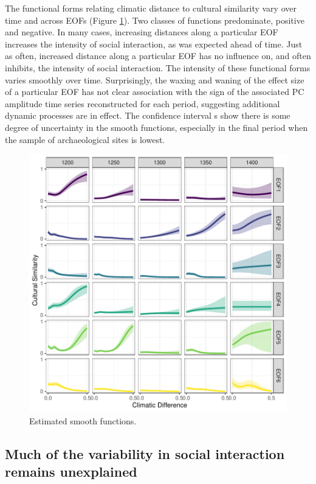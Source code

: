 \documentclass[11pt]{wlscirep}
\begin{document}
The functional forms relating climatic distance to cultural similarity vary over time and across EOFs (Figure \ref{fig:smooths}). Two classes of functions predominate, positive and negative. In many cases, increasing distances along a particular EOF increases the intensity of social interaction, as was expected ahead of time. Just as often, increased distance along a particular EOF has no influence on, and often inhibits, the intensity of social interaction. The intensity of these functional forms varies smoothly over time. Surprisingly, the waxing and waning of the effect size of a particular EOF has not clear association with the sign of the associated PC amplitude time series reconstructed for each period, suggesting additional dynamic processes are in effect.
The confidence interval s show there is some degree of uncertainty in the smooth functions, especially in the final period when the sample of archaeological sites is lowest.

\begin{figure}[!htbp]
\centering
\includegraphics[width=.9\linewidth]{figures/smooths.pdf}
\caption{Estimated smooth functions.}
\label{fig:smooths}
\end{figure}

\subsection*{Much of the variability in social interaction remains unexplained}
\end{document}
